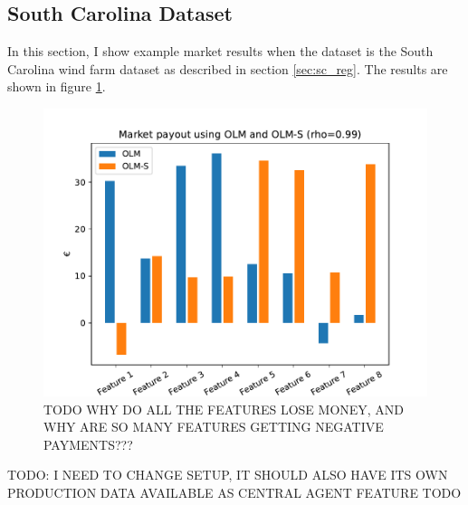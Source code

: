 \subsection{South Carolina Dataset}
In this section, I show example market results when the dataset is the South
Carolina wind farm dataset as described in section \ref{sec:sc_reg}.
The results are shown in figure \ref{fig:south_carolina_market}.

\begin{figure}
  \centering
  \includegraphics[width=.9\linewidth]{Pictures/south_carolina_market.pdf}
  \caption{TODO WHY DO ALL THE FEATURES LOSE MONEY, AND WHY ARE SO MANY FEATURES GETTING NEGATIVE PAYMENTS???}
  \label{fig:south_carolina_market}
\end{figure}

TODO: I NEED TO CHANGE SETUP, IT SHOULD ALSO HAVE ITS OWN PRODUCTION DATA AVAILABLE AS CENTRAL AGENT FEATURE
TODO
